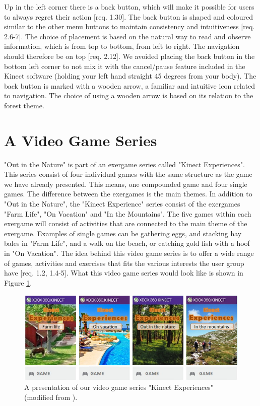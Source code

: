 Up in the left corner there is a back button, which will make it possible for users to always regret their action [req. 1.30]. The back button is shaped and coloured similar to the other menu buttons to maintain consistency and intuitiveness [req. 2.6-7]. The choice of placement is based on the natural way to read and observe information, which is from top to bottom, from left to right. The navigation should therefore be on top [req. 2.12]. We avoided placing the back button in the bottom left corner to not mix it with the cancel/pause feature included in the Kinect software (holding your left hand straight 45 degrees from your body). The back button is marked with a wooden arrow, a familiar and intuitive icon related to navigation. The choice of using a wooden arrow is based on its relation to the forest theme. 
     
\section{A Video Game Series}
"Out in the Nature" is part of an exergame series called "Kinect Experiences". This series consist of four individual games with the same structure as the game we have already presented. This means, one compounded game and four single games. The difference between the exergames is the main themes. In addition to "Out in the Nature", the "Kinect Experience" series consist of the exergames "Farm Life", "On Vacation" and "In the Mountains". The five games within each exergame will consist of activities that are connected to the main theme of the exergame. Examples of single games can be gathering eggs, and stacking hay bales in "Farm Life", and a walk on the beach, or catching gold fish with a hoof in "On Vacation". The idea behind this video game series is to offer a wide range of games, activities and exercises that fits the various interests the user group have [req. 1.2, 1.4-5]. What this video game series would look like is shown in Figure \ref{fig:videogameseriesAlone}. 

\begin{figure} [H]
\centering
\includegraphics[scale=0.65]{videoGameSeriesAlone.jpg}
\caption[Presentation of our video game series]{A presentation of our video game series "Kinect Experiences" (modified from \cite{XboxNettside}).}
\label{fig:videogameseriesAlone}
\end{figure}

